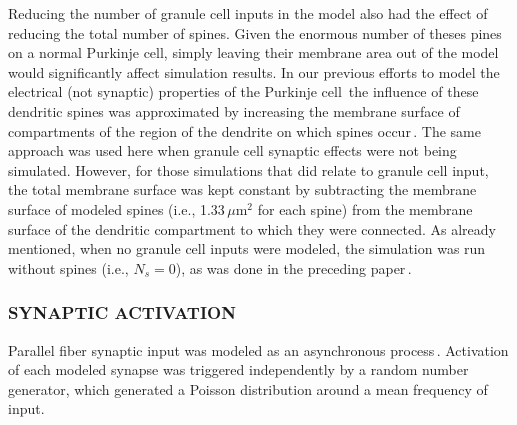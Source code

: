\documentclass[12pt]{article}
\begin{document}
Reducing the number of granule cell inputs in the model also
had the effect of reducing the total number of spines. Given the
enormous number of theses pines on a normal Purkinje cell, simply
leaving their membrane area out of the model would significantly
affect simulation results. In our previous efforts to model
the electrical (not synaptic) properties of the Purkinje cell\,\cite{deschutter94:_purkin_i}
the influence of these dendritic spines
was approximated by increasing the membrane surface of compartments
of the region of the dendrite on which spines occur\,\cite{R:1989cr, Jaslove:1992fu, Jaslove:1992fu}.
The same approach was used here when granule cell synaptic effects
were not being simulated. However, for those simulations that did
relate to granule cell input, the total membrane surface was kept
constant by subtracting the membrane surface of modeled spines
(i.e., 1.33\,$\mu$m$^2$ for each spine) from the membrane surface of the
dendritic compartment to which they were connected. As already mentioned,
when no granule cell inputs were modeled,
the simulation was run without spines (i.e., $N_s = 0$), as was
done in the preceding paper\,\cite{deschutter94:_purkin_i}.

\subsubsection*{SYNAPTIC ACTIVATION}

Parallel fiber synaptic input was modeled
as an asynchronous process\,\cite{Bernard:1991ye}.
Activation of each modeled synapse was triggered independently
by a random number generator, which generated a Poisson distribution
around a mean frequency of input.



\end{document}
